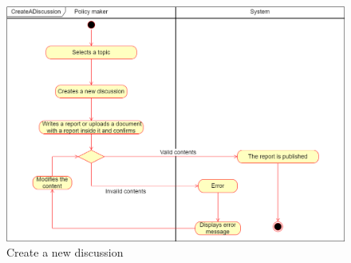     \begin{figure}[h!]
        \centering
        \includegraphics[scale=0.35]{images/use_cases_diagram/policymaker_create_discussion.png}
        \caption{Create a new discussion}
        \label{fig:policymaker_create_discussion}
    \end{figure}
 \FloatBarrier
 

